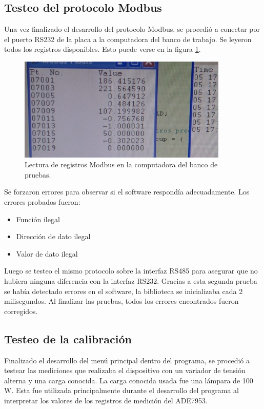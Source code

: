 \subsection{Testeo del protocolo Modbus}

Una vez finalizado el desarrollo del protocolo Modbus, se procedió a conectar por el puerto RS232 de la placa a la computadora del banco de trabajo. Se leyeron todos los registros disponibles. Esto puede verse en la figura \ref{fig:ModPC}. 

\begin{figure}[!htb]
	\centering
	\includegraphics[width=100mm,keepaspectratio]{Figures/ModbusTest.jpg}
	\caption{ Lectura de registros Modbus en la computadora del banco de pruebas.}
	\label{fig:ModPC}
\end{figure}

Se forzaron errores para observar si el software respondía adecuadamente. Los errores probados fueron:

\begin{itemize}
\item Función ilegal
\item Dirección de dato ilegal
\item Valor de dato ilegal
\end{itemize}

Luego se testeo el mismo protocolo sobre la interfaz RS485 para asegurar que no hubiera ninguna diferencia con la interfaz RS232. Gracias a esta segunda prueba se había detectado errores en el software, la biblioteca se inicializaba cada 2 milisegundos. Al finalizar las pruebas, todos  los errores encontrados fueron corregidos.


\subsection{Testeo de la calibración}

Finalizado el desarrollo del  menú principal dentro del programa, se procedió a testear las mediciones que realizaba el dispositivo con un variador de tensión alterna y una carga conocida.
La carga conocida usada fue una lámpara de 100 W. Esta fue utilizada principalmente durante el desarrollo del programa al interpretar los valores de los registros de medición del ADE7953.
 

